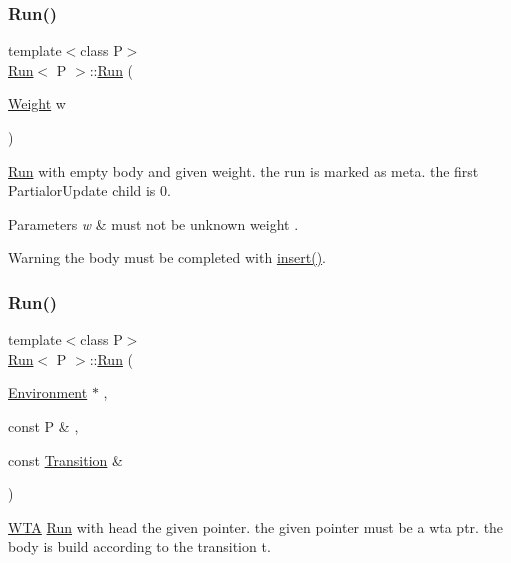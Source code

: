 \subsubsection{\texorpdfstring{Run()}{Run()}\hspace{0.1cm}{\footnotesize\ttfamily [1/4]}}
{\footnotesize\ttfamily template$<$class P$>$ \\
\mbox{\hyperlink{classRun}{Run}}$<$ P $>$\+::\mbox{\hyperlink{classRun}{Run}} (\begin{DoxyParamCaption}\item[{\mbox{\hyperlink{classWeight}{Weight}}}]{w }\end{DoxyParamCaption})}



\mbox{\hyperlink{classRun}{Run}} with empty body and given weight. the run is marked as meta. the first Partialor\+Update child is 0. 


\begin{DoxyParams}{Parameters}
{\em w} & must not be unknown weight . \\
\hline
\end{DoxyParams}
\begin{DoxyWarning}{Warning}
the body must be completed with \mbox{\hyperlink{classRun_ab41a4b6f0347b7b412637d505614b98f}{insert()}}. 
\end{DoxyWarning}
\mbox{\label{classRun_a0a075a813930403154728bcea9062a55}} 
\subsubsection{\texorpdfstring{Run()}{Run()}\hspace{0.1cm}{\footnotesize\ttfamily [2/4]}}
{\footnotesize\ttfamily template$<$class P$>$ \\
\mbox{\hyperlink{classRun}{Run}}$<$ P $>$\+::\mbox{\hyperlink{classRun}{Run}} (\begin{DoxyParamCaption}\item[{\mbox{\hyperlink{classEnvironment}{Environment}} $\ast$}]{,  }\item[{const P \&}]{,  }\item[{const \mbox{\hyperlink{classTransition}{Transition}} \&}]{ }\end{DoxyParamCaption})}



\mbox{\hyperlink{classWTA}{W\+TA}} \mbox{\hyperlink{classRun}{Run}} with head the given pointer. the given pointer must be a wta ptr. the body is build according to the transition t. 


